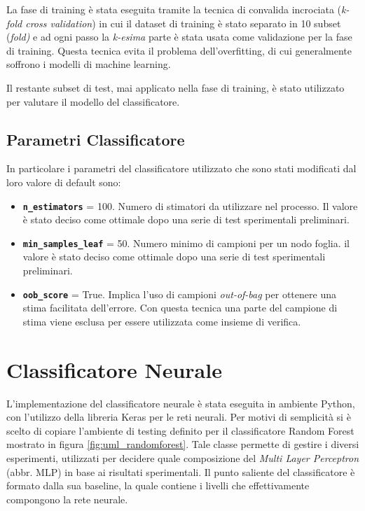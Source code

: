 La fase di training è stata eseguita tramite la tecnica di convalida incrociata (\textit{k-fold cross validation}) in cui il dataset di training è stato separato in 10 subset (\textit{fold)} e ad ogni passo la \textit{k-esima} parte è stata usata come validazione per la fase di training. Questa tecnica evita il problema dell'overfitting, di cui generalmente soffrono i modelli di machine learning.

Il restante subset di test, mai applicato nella fase di training, è stato utilizzato per valutare il modello del classificatore.


\subsection{Parametri Classificatore}
In particolare i parametri del classificatore utilizzato che sono stati modificati dal loro valore di default sono:
\begin{itemize}
\item \textbf{\texttt{n\_estimators}} = 100. Numero di stimatori da utilizzare nel processo. Il valore è stato deciso come ottimale dopo una serie di test sperimentali preliminari.
\item \textbf{\texttt{min\_samples\_leaf}} = 50. Numero minimo di campioni per un nodo foglia. il valore è stato deciso come ottimale dopo una serie di test sperimentali preliminari.
\item \textbf{\texttt{oob\_score}} = True. Implica l'uso di campioni \textit{out-of-bag} per ottenere una stima facilitata dell'errore. Con questa tecnica una parte del campione di stima viene esclusa per essere utilizzata come insieme di verifica.
\end{itemize}

\section{Classificatore Neurale}
\label{imp:classneurale}
L'implementazione del classificatore neurale è stata eseguita in ambiente Python, con l'utilizzo della libreria Keras \cite{keras} per le reti neurali.
Per motivi di semplicità si è scelto di copiare l'ambiente di testing definito per il classificatore Random Forest mostrato in figura  \ref{fig:uml_randomforest}. Tale classe permette di gestire i diversi esperimenti, utilizzati per decidere quale composizione del \textit{Multi Layer Perceptron}  (abbr. MLP) in base ai risultati sperimentali. 
Il punto saliente del classificatore è formato dalla sua baseline, la quale contiene i livelli che effettivamente compongono la rete neurale.

